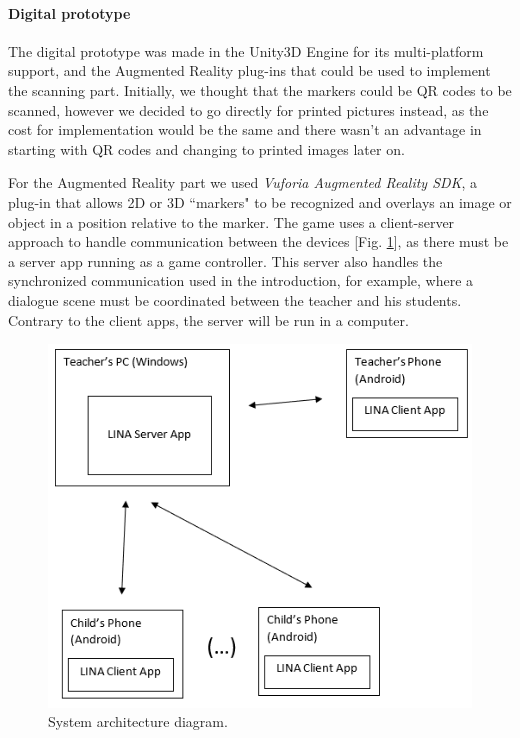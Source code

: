 \documentclass[runningheads]{llncs}
\begin{document}
\paragraph{Digital prototype} The digital prototype was made in the Unity3D Engine for its multi-platform support, and the Augmented Reality plug-ins that could be used to implement the scanning part. Initially, we thought that the markers could be QR codes to be scanned, however we decided to go directly for printed pictures instead, as the cost for implementation would be the same and there wasn't an advantage in starting with QR codes and changing to printed images later on.
\par For the Augmented Reality part we used \textit{Vuforia Augmented Reality SDK}, a plug-in that allows 2D or 3D ``markers" to be recognized and overlays an image or object in a position relative to the marker. The game uses a client-server approach to handle communication between the devices [Fig. \ref{fig:diagram}], as there must be a server app running as a game controller. This server also handles the synchronized communication used in the introduction, for example, where a dialogue scene must be coordinated between the teacher and his students. Contrary to the client apps, the server will be run in a computer.

\begin{figure}
    \centering
    \includegraphics[scale = 0.7]{Diagram.png}
    \caption{System architecture diagram.}
    \label{fig:diagram}
\end{figure}
\end{document}
